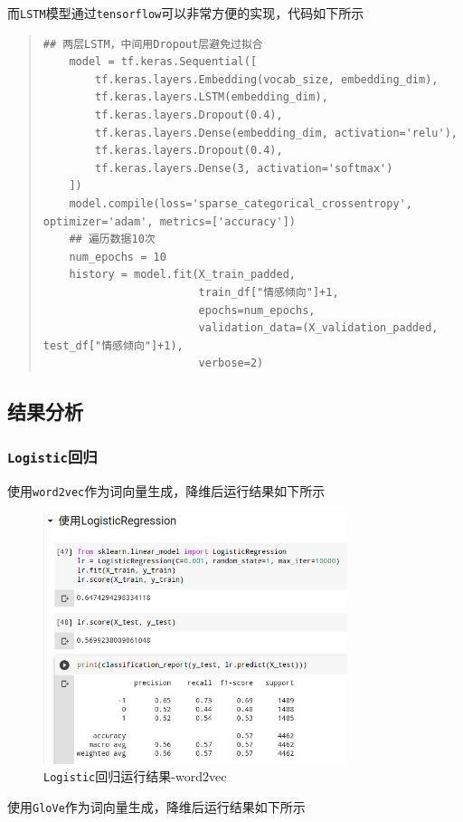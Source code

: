 \documentclass[UTF8]{ctexart}
\begin{document}
而\lstinline{LSTM}模型通过\lstinline{tensorflow}可以非常方便的实现，代码如下所示
\begin{quote}
    \begin{lstlisting}[]
    ## 两层LSTM，中间用Dropout层避免过拟合
    model = tf.keras.Sequential([
        tf.keras.layers.Embedding(vocab_size, embedding_dim),
        tf.keras.layers.LSTM(embedding_dim),
        tf.keras.layers.Dropout(0.4),
        tf.keras.layers.Dense(embedding_dim, activation='relu'),
        tf.keras.layers.Dropout(0.4),
        tf.keras.layers.Dense(3, activation='softmax')
    ])
    model.compile(loss='sparse_categorical_crossentropy', optimizer='adam', metrics=['accuracy'])
    ## 遍历数据10次
    num_epochs = 10
    history = model.fit(X_train_padded,
                        train_df["情感倾向"]+1,
                        epochs=num_epochs,
                        validation_data=(X_validation_padded, test_df["情感倾向"]+1), 
                        verbose=2)
    \end{lstlisting}
\end{quote}
\newpage
\subsection{结果分析}
\subsubsection{\lstinline{Logistic}回归}
使用\lstinline{word2vec}作为词向量生成，降维后运行结果如下所示
\begin{figure}[htb]
    \centering
    \includegraphics[width=3.5in]{asset/Logistic_word2vec.png}
    \caption{\lstinline{Logistic}回归运行结果-word2vec} 
\end{figure}

使用\lstinline{GloVe}作为词向量生成，降维后运行结果如下所示
\end{document}
